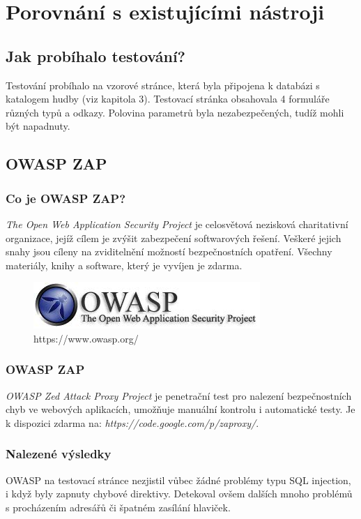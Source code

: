\chapter{Porovnání s existujícími nástroji}

\section{Jak probíhalo testování?}
Testování probíhalo na vzorové stránce, která byla připojena k databázi s katalogem hudby (viz kapitola 3). Testovací stránka obsahovala 4 formuláře různých typů a odkazy. Polovina parametrů byla nezabezpečených, tudíž mohli být napadnuty.

\section{OWASP ZAP}
\subsection{Co je OWASP ZAP?}
\textit{The Open Web Application Security Project} je celosvětová nezisková charitativní organizace\cite{owasp}, jejíž cílem je zvýšit zabezpečení softwarových řešení. Veškeré jejich snahy jsou cíleny na zviditelnění možností bezpečnostních opatření. Všechny materiály, knihy a software, který je vyvíjen je zdarma. 

\begin{figure}[h!]
\centerline{\includegraphics[width=325px]{./examples/owasp.jpeg}}
\caption{https://www.owasp.org/}
\label{owasp}
\end{figure}

\subsection{OWASP ZAP}
\textit{OWASP Zed Attack Proxy Project} je penetrační test pro nalezení bezpečnostních chyb ve webových aplikacích, umožňuje manuální kontrolu i automatické testy. Je k dispozici zdarma na: \textit{https://code.google.com/p/zaproxy/}.

\subsection{Nalezené výsledky}
OWASP na testovací stránce nezjistil vůbec žádné problémy typu SQL injection, i když byly zapnuty chybové direktivy. Detekoval ovšem dalších mnoho problémů s procházením adresářů či špatném zasílání hlaviček.

